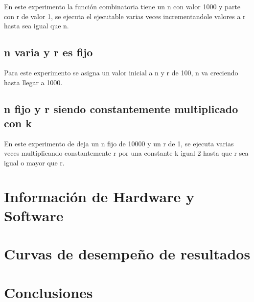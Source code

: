 \documentclass[12pt,letterpaper]{scrartcl}
\begin{document}
En este experimento la función combinatoria tiene un n con valor 1000 y parte con r de valor 1, se ejecuta el ejecutable varias veces incrementandole valores a r hasta sea igual que n.

\subsection{n varia y r es fijo}

Para este experimento se asigna un valor inicial a n y r de 100, n  va creciendo hasta llegar a 1000.

\subsection{n fijo y r siendo constantemente multiplicado con k}

En este experimento de deja un n fijo de 10000 y un r de 1, se ejecuta varias veces multiplicando constantemente r por una constante k igual 2 hasta que r sea igual o mayor que r.


\section{Información de Hardware y Software}

\section{Curvas de desempeño de resultados}

\section{Conclusiones}
\end{document}
